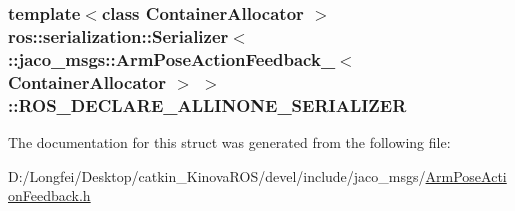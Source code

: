 \subsubsection[{\texorpdfstring{R\+O\+S\+\_\+\+D\+E\+C\+L\+A\+R\+E\+\_\+\+A\+L\+L\+I\+N\+O\+N\+E\+\_\+\+S\+E\+R\+I\+A\+L\+I\+Z\+ER}{ROS_DECLARE_ALLINONE_SERIALIZER}}]{\setlength{\rightskip}{0pt plus 5cm}template$<$class Container\+Allocator $>$ ros\+::serialization\+::\+Serializer$<$ \+::{\bf jaco\+\_\+msgs\+::\+Arm\+Pose\+Action\+Feedback\+\_\+}$<$ Container\+Allocator $>$ $>$\+::R\+O\+S\+\_\+\+D\+E\+C\+L\+A\+R\+E\+\_\+\+A\+L\+L\+I\+N\+O\+N\+E\+\_\+\+S\+E\+R\+I\+A\+L\+I\+Z\+ER}\hypertarget{structros_1_1serialization_1_1Serializer_3_01_1_1jaco__msgs_1_1ArmPoseActionFeedback___3_01ContainerAllocator_01_4_01_4_a198b3f7c099d4b9c53c4bb09ad32b825}{}\label{structros_1_1serialization_1_1Serializer_3_01_1_1jaco__msgs_1_1ArmPoseActionFeedback___3_01ContainerAllocator_01_4_01_4_a198b3f7c099d4b9c53c4bb09ad32b825}


The documentation for this struct was generated from the following file\+:\begin{DoxyCompactItemize}
\item 
D\+:/\+Longfei/\+Desktop/catkin\+\_\+\+Kinova\+R\+O\+S/devel/include/jaco\+\_\+msgs/\hyperlink{ArmPoseActionFeedback_8h}{Arm\+Pose\+Action\+Feedback.\+h}\end{DoxyCompactItemize}
